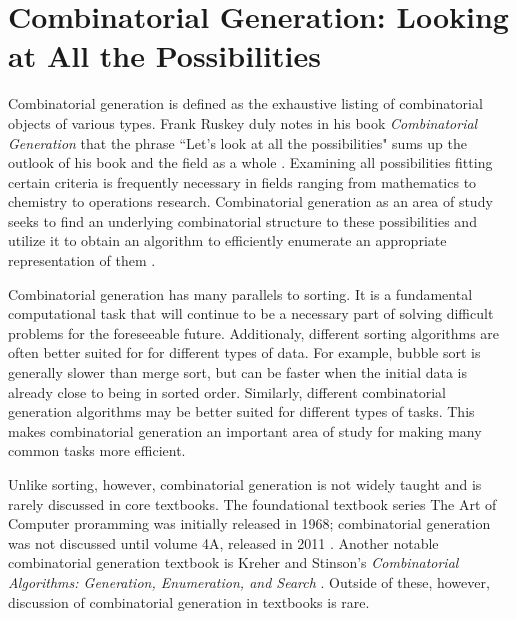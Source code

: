 

\section{Combinatorial Generation: Looking at All the Possibilities}

Combinatorial generation is defined as the exhaustive listing of combinatorial objects of various types.  Frank Ruskey duly notes in his book \emph{Combinatorial Generation} that the phrase ``Let's look at all the possibilities" sums up the outlook of his book and the field as a whole \cite{ruskey2003combinatorial}. Examining all possibilities fitting certain criteria is frequently necessary in fields ranging from mathematics to chemistry to operations research. Combinatorial generation as an area of study seeks to find an underlying combinatorial structure to these possibilities and utilize it to obtain an algorithm to efficiently enumerate an appropriate representation of them \cite{ruskey2003combinatorial}. 

Combinatorial generation has many parallels to sorting.  It is a fundamental computational task that will continue to be a necessary part of solving difficult problems for the foreseeable future.  Additionaly, different sorting algorithms are often better suited for for different types of data.  For example, bubble sort is generally slower than merge sort, but can be faster when the initial data is already close to being in sorted order. Similarly, different combinatorial generation algorithms may be better suited for different types of tasks.  This makes combinatorial generation an important area of study for making many common tasks more efficient.  

Unlike sorting, however, combinatorial generation is not widely taught and is rarely discussed in core textbooks. The foundational textbook series The Art of Computer proramming was initially released in 1968; combinatorial generation was not discussed until volume 4A, released in 2011 \cite{knuth2015art}.  Another notable combinatorial generation textbook is  Kreher and Stinson's \emph{Combinatorial Algorithms: Generation, Enumeration, and Search} \cite{kreher2020combinatorial}. Outside of these, however, discussion of combinatorial generation in textbooks is rare.

